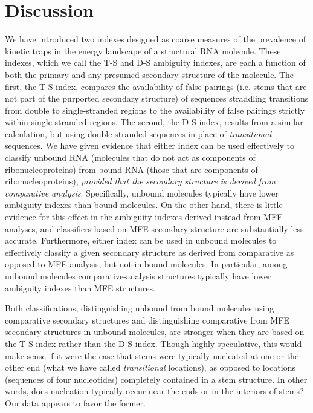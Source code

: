 \documentclass[10pt,letterpaper]{article}
\begin{document}
\section*{Discussion}
We have introduced two indexes designed as coarse measures of the prevalence of kinetic traps in the energy landscape of a structural RNA molecule. These indexes, which we call the T-S and D-S ambiguity indexes, are each a function of both the primary and any presumed secondary structure of the molecule. The first, the T-S index, compares the availability of false pairings (i.e. stems that are not part of the purported secondary structure) of sequences straddling transitions from double to single-stranded regions to the availability of false pairings strictly within single-stranded regions.
The second, the D-S index, results from a similar calculation, but using double-stranded sequences in place of {\em transitional} sequences. We have given evidence that either index can be used effectively to classify unbound RNA (molecules that do not act as components of ribonucleoproteins) from bound RNA (those that are components of ribonucleoproteins), {\em provided that the secondary structure is derived from comparative analysis}. 
Specifically, unbound molecules typically have lower ambiguity indexes than bound molecules. On the other hand, there is little evidence for this effect in the ambiguity indexes derived instead from MFE analyses, and classifiers based on MFE secondary structure are substantially less accurate. Furthermore, either index can be used in unbound molecules to effectively classify a given secondary structure as derived from comparative as opposed to MFE analysis, but not in bound molecules. In particular, among unbound molecules comparative-analysis structures typically have lower ambiguity indexes than MFE structures.

Both classifications, distinguishing unbound from bound molecules using comparative secondary structures and distinguishing comparative from MFE secondary structures in unbound molecules, are stronger when they are based on the T-S index rather than the D-S index. Though highly speculative, this would make sense if it were the case that stems were typically nucleated at one or the other end (what we have called {\em transitional} locations), as opposed to locations (sequences of four nucleotides) completely contained in a stem structure. In other words, does nucleation typically occur near the ends or in the interiors of stems? Our data appears to favor the former. 
\end{document}

